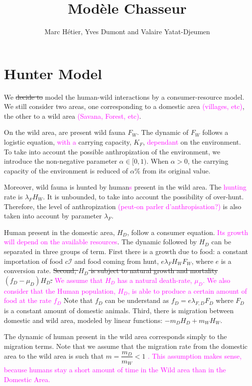 \documentclass{article}
\title{Modèle Chasseur}
\author{Marc Hétier, Yves Dumont  and Valaire Yatat-Djeumen}
\newcommand{\lfw}{\lambda_{F}}
\newcommand{\lfd}{\lambda_{F, D}}
\newcommand{\lfw}{\lambda_{F}}
\newcommand{\cI}{c \mathcal{I}}
\newcommand{\YD}[1]{\textcolor{magenta}{#1}}
\begin{document}
\maketitle


\section{Hunter Model}

We \sout{decide to} model the human-wild interactions by a consumer-resource model. We still consider two areas, one corresponding to a domestic area \YD{(villages, etc)}, the other to a wild area \YD{(Savana, Forest, etc)}.


On the wild area, are present wild fauna $F_W$. The dynamic of $F_W$ follows a logistic equation, \YD{with a} carrying capacity, $K_F$, \YD{dependant} on the environment. To take into account the possible anthropization of the environment, we introduce the non-negative parameter $\alpha \in [0, 1)$. When $\alpha > 0$, the carrying capacity of the environment is reduced of $\alpha \%$ from its original value.

Moreover, wild fauna is hunted by human\YD{s} present in the wild area. The \YD{hunting} rate is $\lfw H_W$. It is unbounded, to take into account the possibility of over-hunt. Therefore, the level of anthropization \YD{(peut-on parler d'anthropisation?)} is also taken into account by parameter $\lfw$.

Human present in the domestic area, $H_D$, follow a consumer equation. \YD{Its growth will depend on the available resources}. The dynamic followed by $H_D$ can be separated in three groups of term. First there is a growth due to food: a constant importation of food $\cI$ and food coming from hunt, $e \lfw H_W F_W$, where $e$ is a conversion rate. \sout{Second, $H_D$ is subject to natural growth and mortality $(f_D - \mu_D) H_D$.} \YD{We assume that $H_D$ has a natural death-rate, $\mu_D$. We also consider that the Human population, $H_D$, is able to produce a certain amount of food at the rate $f_D$} Note that $f_D$ can be understand as $f_D = e \lfd F_D$ where $F_D$ is a constant amount of domestic animals. Third, there is migration between domestic and wild area, modeled by linear functions: $-m_D H_D + m_W H_W$.

The dynamic of human present in the wild area corresponds simply to the migration terms. Note that we assume that the migration rate from the domestic area to the wild area is such that $m = \dfrac{m_D}{m_W} < 1$ \YD{. This assumption makes sense, because humans stay a short amount of time in the Wild area than in the Domestic Area.}
\end{document}
